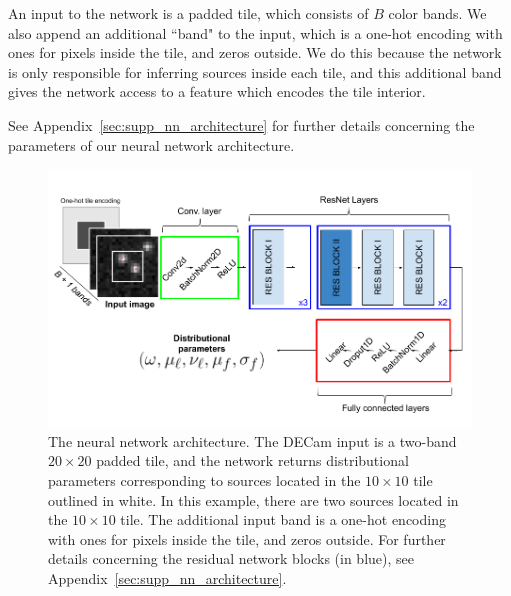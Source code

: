 An input to the network is a padded tile, which consists of $B$ color bands. 
We also append an additional ``band" to the input, which 
is a one-hot encoding with
ones for pixels inside the tile, and zeros outside. 
We do this because the network is only responsible for inferring sources inside each tile, and this additional band gives
the network access to a feature which encodes the tile interior. 

See Appendix~\ref{sec:supp_nn_architecture} for further details 
concerning the parameters of our neural network architecture. 



\begin{figure}[!tb]
    \centering
    \includegraphics[width=\textwidth]{figures_vg/starnet_archetecture9.png}
    \caption{The neural network architecture. The DECam input is a two-band $20\times 20$ padded tile, 
    and the network returns distributional parameters corresponding to sources located in the $10\times 10$ tile outlined in white.
    In this example, there are two sources located in the $10\times10$ tile.
    The additional input band is a one-hot encoding with ones for pixels inside the tile, and zeros outside. 
    For further details concerning the residual network blocks (in blue), see 
    Appendix~\ref{sec:supp_nn_architecture}.
    }
    \label{fig:starnet_arch}
\end{figure}

